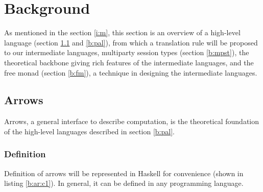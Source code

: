\chapter{Background} \label{b}
As mentioned in the section \ref{i:m}, this section is an overview of a high-level language (section \ref{b:arrows} and \ref{b:pal}), from which a translation rule will be proposed to our intermediate languages, multiparty session types (section \ref{b:mpst}), the theoretical backbone giving rich features of the intermediate languages, and the free monad (section \ref{b:fm}), a technique in designing the intermediate languages.

\section{Arrows} \label{b:arrows}
Arrows, a general interface to describe computation, is the theoretical foundation of the high-level languages described in section \ref{b:pal}.
\subsection{Definition}
Definition of arrows will be represented in Haskell for convenience (shown in listing \ref{b:ar:c1}). In general, it can be defined in any programming language.

